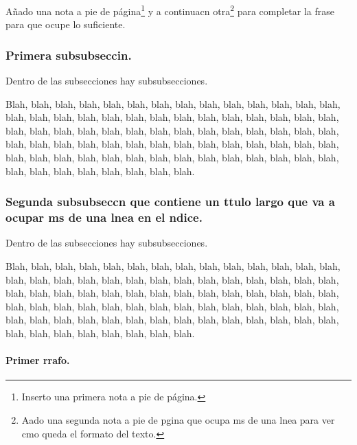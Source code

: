Añado una nota a pie de página\footnote{Inserto una primera nota a pie de página.} y a continuacn otra\footnote{Aado una segunda nota a pie de pgina que ocupa ms de una lnea para ver cmo queda el formato del texto.} para completar la frase para que ocupe lo suficiente.

\subsubsection{Primera subsubseccin.}

Dentro de las subsecciones  hay subsubsecciones.

Blah, blah, blah, blah, blah, blah, blah, blah, blah, blah, blah, blah, blah,
blah, blah, blah, blah, blah, blah, blah, blah, blah, blah, blah, blah, blah,
blah, blah, blah, blah, blah, blah, blah, blah, blah, blah, blah, blah, blah,
blah, blah, blah, blah, blah, blah, blah, blah, blah, blah, blah, blah, blah,
blah, blah, blah, blah, blah, blah, blah, blah, blah, blah, blah, blah, blah,
blah, blah, blah, blah, blah, blah, blah, blah, blah, blah, blah, blah, blah.

\subsubsection{Segunda subsubseccn que contiene un ttulo largo que va a ocupar ms de una lnea en el ndice.}

Dentro de las subsecciones  hay subsubsecciones.

Blah, blah, blah, blah, blah, blah, blah, blah, blah, blah, blah, blah, blah,
blah, blah, blah, blah, blah, blah, blah, blah, blah, blah, blah, blah, blah,
blah, blah, blah, blah, blah, blah, blah, blah, blah, blah, blah, blah, blah,
blah, blah, blah, blah, blah, blah, blah, blah, blah, blah, blah, blah, blah,
blah, blah, blah, blah, blah, blah, blah, blah, blah, blah, blah, blah, blah,
blah, blah, blah, blah, blah, blah, blah, blah, blah, blah, blah, blah, blah.

\paragraph{Primer rrafo.}

